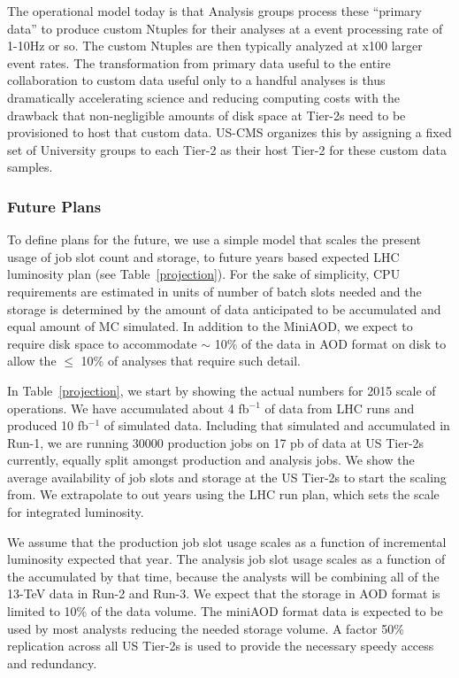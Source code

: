 \documentclass[11pt,a4paper]{article}
\begin{document}
The operational model today is that Analysis groups process these ``primary data'' to produce custom 
Ntuples for their analyses at a event processing rate of 1-10Hz or so. The custom Ntuples are then typically 
analyzed at x100 larger event rates. The transformation from primary data useful to the entire collaboration to custom data useful
only to a handful analyses is thus dramatically accelerating science and reducing computing costs with the drawback that non-negligible
amounts of disk space at Tier-2s need to be provisioned to host that custom data. US-CMS organizes this by assigning a fixed set of 
University groups to each Tier-2 as their host Tier-2 for these custom data samples.

\subsubsection{Future Plans}


To define plans for the future, we use a simple model that scales
the present usage of job slot count and storage, to future years based
expected LHC  luminosity plan (see Table~\ref{projection}).
For the sake of simplicity, CPU requirements are estimated in units of number of 
batch slots needed and the storage is determined by the amount of
data anticipated to be accumulated and equal amount of MC simulated.
In addition to the MiniAOD, we expect to require disk space to accommodate 
$\sim$ 10\% of the data in AOD format on disk to allow the $\le$ 10\% of 
analyses that require such detail.

In Table~\ref{projection}, we start by showing the actual numbers for
2015 scale of operations.  We have accumulated about 4 fb$^{-1}$
of data from LHC runs and produced 10 fb$^{-1}$ of simulated data.
Including that simulated and accumulated in Run-1, we are running
30000 production jobs on 17 pb of data at US Tier-2s currently,
equally split amongst production and analysis jobs.  We show the
average availability of job slots and storage at the US Tier-2s to
start the scaling from.  We extrapolate to out years using the
LHC run plan, which sets the scale for integrated luminosity.

We assume that the production job slot usage scales as a function of 
incremental luminosity expected that year.  The analysis job slot usage
scales as a function of the accumulated by that time, because the analysts
will be combining all of the 13-TeV data in Run-2 and Run-3.
We expect that the storage in AOD format is limited to 10\% of
the data volume.  The miniAOD format data is expected to be
used by most analysts reducing the needed storage volume.  A
factor 50\% replication across all US Tier-2s is used to provide 
the necessary speedy access and redundancy.
\end{document}
